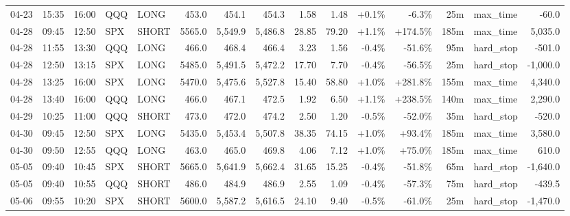 \documentclass[11pt,a4paper,twoside]{article}
\begin{document}
\begin{landscape}
\begin{center}
\begin{longtable}{>{\color{txtmain}}l l l l l r r r r r r r r >{\color{txtmain}}l r}
04-23 & 15:35 & 16:00 & QQQ & LONG & 453.0 & 454.1 & 454.3 & 1.58 & 1.48 & \textcolor{wingreen}{+0.1\%} & \textcolor{lossred}{-6.3\%} & 25m & max\_time & \textcolor{lossred}{-60.0} \\
04-28 & 09:45 & 12:50 & SPX & SHORT & 5565.0 & 5,549.9 & 5,486.8 & 28.85 & 79.20 & \textcolor{wingreen}{+1.1\%} & \textcolor{wingreen}{+174.5\%} & 185m & max\_time & \textcolor{wingreen}{5,035.0} \\
04-28 & 11:55 & 13:30 & QQQ & LONG & 466.0 & 468.4 & 466.4 & 3.23 & 1.56 & \textcolor{lossred}{-0.4\%} & \textcolor{lossred}{-51.6\%} & 95m & hard\_stop & \textcolor{lossred}{-501.0} \\
04-28 & 12:50 & 13:15 & SPX & LONG & 5485.0 & 5,491.5 & 5,472.2 & 17.70 & 7.70 & \textcolor{lossred}{-0.4\%} & \textcolor{lossred}{-56.5\%} & 25m & hard\_stop & \textcolor{lossred}{-1,000.0} \\
04-28 & 13:25 & 16:00 & SPX & LONG & 5470.0 & 5,475.6 & 5,527.8 & 15.40 & 58.80 & \textcolor{wingreen}{+1.0\%} & \textcolor{wingreen}{+281.8\%} & 155m & max\_time & \textcolor{wingreen}{4,340.0} \\
04-28 & 13:40 & 16:00 & QQQ & LONG & 466.0 & 467.1 & 472.5 & 1.92 & 6.50 & \textcolor{wingreen}{+1.1\%} & \textcolor{wingreen}{+238.5\%} & 140m & max\_time & \textcolor{wingreen}{2,290.0} \\
04-29 & 10:25 & 11:00 & QQQ & SHORT & 473.0 & 472.0 & 474.2 & 2.50 & 1.20 & \textcolor{lossred}{-0.5\%} & \textcolor{lossred}{-52.0\%} & 35m & hard\_stop & \textcolor{lossred}{-520.0} \\
04-30 & 09:45 & 12:50 & SPX & LONG & 5435.0 & 5,453.4 & 5,507.8 & 38.35 & 74.15 & \textcolor{wingreen}{+1.0\%} & \textcolor{wingreen}{+93.4\%} & 185m & max\_time & \textcolor{wingreen}{3,580.0} \\
04-30 & 09:50 & 12:55 & QQQ & LONG & 463.0 & 465.0 & 469.8 & 4.06 & 7.12 & \textcolor{wingreen}{+1.0\%} & \textcolor{wingreen}{+75.0\%} & 185m & max\_time & \textcolor{wingreen}{610.0} \\
05-05 & 09:40 & 10:45 & SPX & SHORT & 5665.0 & 5,641.9 & 5,662.4 & 31.65 & 15.25 & \textcolor{lossred}{-0.4\%} & \textcolor{lossred}{-51.8\%} & 65m & hard\_stop & \textcolor{lossred}{-1,640.0} \\
05-05 & 09:40 & 10:55 & QQQ & SHORT & 486.0 & 484.9 & 486.9 & 2.55 & 1.09 & \textcolor{lossred}{-0.4\%} & \textcolor{lossred}{-57.3\%} & 75m & hard\_stop & \textcolor{lossred}{-439.5} \\
05-06 & 09:55 & 10:20 & SPX & SHORT & 5600.0 & 5,587.2 & 5,616.5 & 24.10 & 9.40 & \textcolor{lossred}{-0.5\%} & \textcolor{lossred}{-61.0\%} & 25m & hard\_stop & \textcolor{lossred}{-1,470.0} \\

\end{longtable}
\end{center}
\end{landscape}
\end{document}
